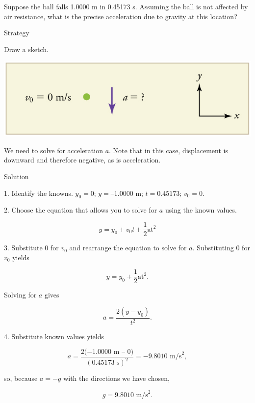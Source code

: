 \documentclass[
]{book}
\begin{document}
Suppose the ball falls 1.0000 m in 0.45173 s. Assuming the ball is not
affected by air resistance, what is the precise acceleration due to
gravity at this location?

{Strategy}

Draw a sketch.

\includegraphics{images/Figure_02_06_02b.jpg}

We need to solve for acceleration \(a{}\). Note that in this case,
displacement is downward and therefore negative, as is acceleration.

{Solution}

1. Identify the knowns. \(y_{0} = 0\); \(y = –1\text{.0000\ m}\);
\({{t = 0}\text{.45173}}{}\); \({v_{0} = 0}{}\).

2. Choose the equation that allows you to solve for \(a{}\) using the
known values.

\leavevmode{}%
\[{{y = {y_{0} + v_{0}}}{t + \frac{1}{2}}\text{at}^{2}}{}\]

3. Substitute 0 for \(v_{0}{}\) and rearrange the equation to solve for
\(a{}\). Substituting 0 for \(v_{0}{}\) yields

\leavevmode{}%
\[{{y = {y_{0} + \frac{1}{2}}}\text{at}^{2}\text{.}}{}\]

Solving for \(a{}\) gives

\leavevmode{}%
\[{{a = \frac{2\left( {y - y_{0}} \right)}{t^{2}}}\text{.}}{}\]

4. Substitute known values yields

\leavevmode{}%
\[{{{a = \frac{2{( - 1}\text{.}\text{0000\ m\ –\ 0})}{(0\text{.}\text{45173\ s})^{2}}} = {- 9}}\text{.}\text{8010\ m/s}^{2},}{}\]

so, because \({a = {- g}}{}\) with the directions we have chosen,

\leavevmode{}%
\[{{{g = 9}\text{.}\text{8010\ m/s}^{2}}.}{}\]
\end{document}
